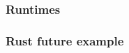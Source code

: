 % 
% 
% 
\begin{frame}[fragile]
    \frametitle{Runtimes}
\end{frame}
% 
% 
% 
% 
\begin{frame}[fragile]
    \frametitle{Rust future example}
\end{frame}
% 
% 
